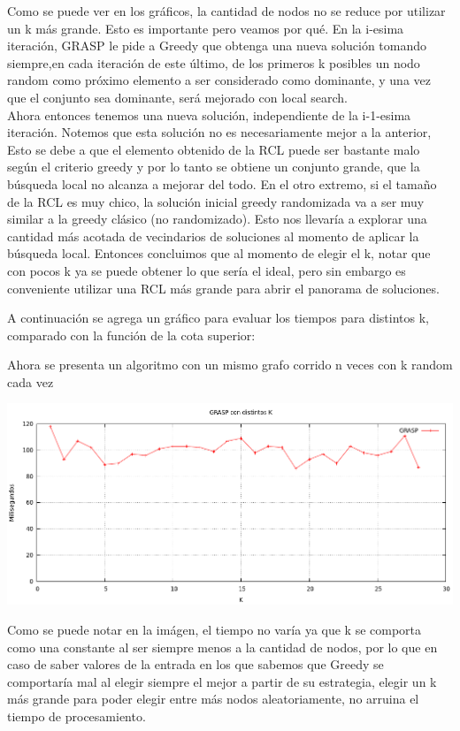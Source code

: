 Como se puede ver en los gráficos, la cantidad de nodos no se reduce por utilizar un k más grande. Esto es importante pero veamos por qué.
En la i-esima iteración, GRASP le pide a Greedy que obtenga una nueva solución tomando siempre,en cada iteración de este último, de los primeros k posibles un nodo random como 
próximo elemento a ser considerado como dominante, y una vez que el conjunto sea dominante, será mejorado con local search.\\
Ahora entonces tenemos una nueva solución, independiente de la i-1-esima iteración. Notemos que esta solución no es necesariamente mejor a la anterior, 
Esto se debe a que el elemento obtenido de la RCL puede ser bastante malo según el criterio greedy y por lo
tanto se obtiene un conjunto grande, que la búsqueda local no alcanza a mejorar del todo. En el otro extremo, si el tamaño de la
RCL es muy chico, la solución inicial greedy randomizada va a ser muy similar a la greedy clásico (no randomizado). Esto nos
llevaría a explorar una cantidad más acotada de vecindarios de soluciones al momento de aplicar la búsqueda local.
Entonces concluimos que al momento de elegir el k, notar que con pocos k ya se puede obtener lo que sería el ideal, pero sin embargo es conveniente utilizar una RCL
más grande para abrir el panorama de soluciones.

A continuación se agrega un gráfico para evaluar los tiempos para distintos k, comparado con la función de la cota superior:






Ahora se presenta un algoritmo con un mismo grafo corrido n veces con k random cada vez

\begin{center}
\includegraphics[width=15cm]{./graficos/GRASP_distintosK.png}
\end{center}

Como se puede notar en la imágen, el tiempo no varía ya que k se comporta como una constante al ser siempre menos a la cantidad de nodos, por lo que en caso de saber valores de la entrada en los que sabemos
que Greedy se comportaría mal al elegir siempre el mejor a partir de su estrategia, elegir un k más grande para poder elegir entre más nodos aleatoriamente, no arruina el tiempo de procesamiento.

